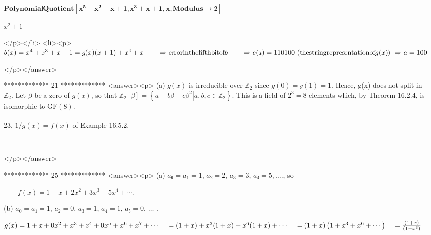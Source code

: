 \begin{doublespace}
\noindent\(\pmb{\text{PolynomialQuotient}\left[x^5+x^2+x+1,x^3+ x+1,x,\text{Modulus}\to 2\right]}\)
\end{doublespace}

\begin{doublespace}
\noindent\(x^2+1\)
\end{doublespace}

</p></li>
<li><p> \(b(x) = x^4+x^3+ x+1= g(x)(x+1)+x^2+x\\
\\
\quad \quad \Rightarrow  \text{error} \text{in} \text{the} \text{fifth} \text{bit} \text{of} \text{\textit{$b$}}\\
\\
\quad \quad \Rightarrow e(a) = 110100\text{   }(\text{the} \text{string} \text{representation} \text{of} g(x))\\
\\
\text{                                  }\Rightarrow  a=100\)

</p></answer>


*************
21
*************
<answer><p> (a) \(g(x)\) is irreducible over \(\mathbb{Z}_2\) since \(g(0) = g(1) = 1\). Hence, g(x) does not split  in \(\mathbb{Z}_2\). Let \(\beta\)
be a zero of \(g(x)\), so that \(\mathbb{Z}_2[\beta ]= \left\{\left.a+b \beta  + c \beta ^2\right| a,b,c\in \mathbb{Z}_2\right\}\).  This is a
field of \(2^3=8\) elements which, by Theorem 16.2.4, is isomorphic to \(\text{GF}(8)\).\\
\\
23. \(1/g(x) = f(x)\) of Example 16.5.2.

\begin{doublespace}
\noindent\(\)
\end{doublespace}

</p></answer>


*************
25
*************
<answer><p> (a)  \(a_0= a_1= 1\), \(a_2=2\), \(a_3= 3\), \(a_4= 5, \ldots\)., so 



$\quad \quad $\(f(x)=1 + x +2x^2+ 3x^3+ 5x^4+ \cdots\).



 (b)  \(a_0= a_1= 1\), \(a_2= 0\), \(a_3= 1\), \(a_4= 1\), \(a_5= 0\), $\ldots $ .  



\(g(x) = 1 + x +0 x^2 + x^3+ x^4+ 0x^5+ x^6+x^7+\cdots \\
\\
\quad =(1+x) + x^3(1+x) + x^6(1+x) + \cdots \\
\\
\quad = (1+x)\left(1+x^3+ x^6+ \cdots \right)\\
\\
\quad = \frac{(1+x)}{\left(1-x^3\right)}\)  


